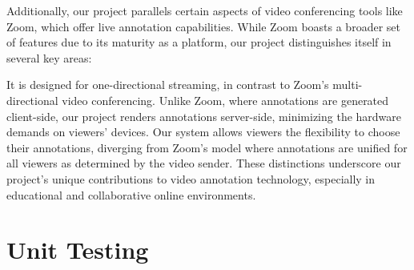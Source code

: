 \documentclass[12pt, titlepage]{article}
\begin{document}
Additionally, our project parallels certain aspects of video conferencing tools like Zoom, which offer live annotation capabilities. While Zoom boasts a broader set of features due to its maturity as a platform, our project distinguishes itself in several key areas:

It is designed for one-directional streaming, in contrast to Zoom's multi-directional video conferencing.
Unlike Zoom, where annotations are generated client-side, our project renders annotations server-side, minimizing the hardware demands on viewers' devices.
Our system allows viewers the flexibility to choose their annotations, diverging from Zoom's model where annotations are unified for all viewers as determined by the video sender.
These distinctions underscore our project's unique contributions to video annotation technology, especially in educational and collaborative online environments.

\section{Unit Testing}
\end{document}
